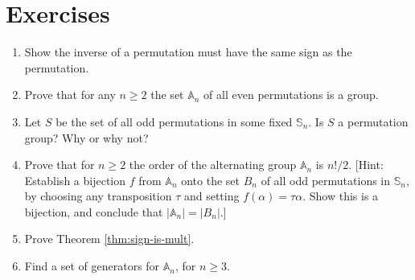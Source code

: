\documentclass[11pt]{article}
\newenvironment{problems}
{
 \begin{enumerate}[topsep=1pt,itemsep=0pt,parsep=2pt,leftmargin=0.6cm,%
 label={\arabic*.}, ref=\arabic*] \small
}
{
 \end{enumerate}
}
\theoremstyle{definition}
\newcommand{\Sym}{\mathbb{S}}
\newcommand{\Alt}{\mathbb{A}}
\begin{document}
\section*{Exercises}



\begin{problems}

\item Show the inverse of a permutation must have the same sign as the
  permutation.

\item Prove that for any $n \ge 2$ the set $\Alt_n$ of all even
  permutations is a group.

\item Let $S$ be the set of all odd permutations in some fixed
  $\Sym_n$. Is $S$ a permutation group? Why or why not?

\item Prove that for $n \ge 2$ the order of the alternating group
  $\Alt_n$ is $n!/2$.  [Hint: Establish a bijection $f$ from $\Alt_n$
  onto the set $B_n$ of all odd permutations in $\Sym_n$, by choosing
  any transposition $\tau$ and setting $f(\alpha) = \tau\alpha$. Show
  this is a bijection, and conclude that $|\Alt_n| = |B_n|$.]

\item Prove Theorem \ref{thm:sign-is-mult}.




\item Find a set of generators for $\Alt_n$, for $n \ge 3$.
\end{problems}
\end{document}
